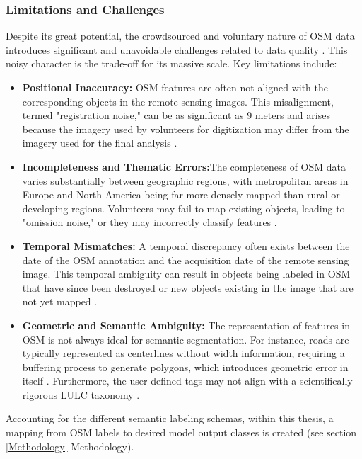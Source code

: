 \documentclass{report}
\begin{document}
\subsubsection{Limitations and Challenges}
\label{sec:osm_limitations_challenges}
Despite its great potential, the crowdsourced and voluntary nature of OSM data introduces significant and unavoidable challenges related to data quality \parencites[p.~3ff.]{UsmaniEtAlRemoteSensingDeepLearningUnderstandNoisyOpenStreetMap2023}. This noisy character is the trade-off for its massive scale. Key limitations include:
\begin{itemize}
\item \textbf{Positional Inaccuracy:} OSM features are often not aligned with the corresponding objects in the remote sensing images. This misalignment, termed "registration noise," can be as significant as 9 meters and arises because the imagery used by volunteers for digitization may differ from the imagery used for the final analysis \parencites[p.~2;]{UsmaniEtAlRemoteSensingDeepLearningUnderstandNoisyOpenStreetMap2023}[p.~1, 3]{KaiserEtAlLearningAerialImageSegmentationOnlineMaps2017}.


    \item \textbf{Incompleteness and Thematic Errors:}The completeness of OSM data varies substantially between geographic regions, with metropolitan areas in Europe and North America being far more densely mapped than rural or developing regions\parencites[p.~4]{DengNewsamQuantitativeComparisonOpenSourceDataFineGrainMappingLandUse2017}. Volunteers may fail to map existing objects, leading to "omission noise," or they may incorrectly classify features \parencites[p.~3]{UsmaniEtAlRemoteSensingDeepLearningUnderstandNoisyOpenStreetMap2023}.
    \item \textbf{Temporal Mismatches:} A temporal discrepancy often exists between the date of the OSM annotation and the acquisition date of the remote sensing image. This temporal ambiguity can result in objects being labeled in OSM that have since been destroyed or new objects existing in the image that are not yet mapped \parencites[p.~1;]{KaiserEtAlLearningAerialImageSegmentationOnlineMaps2017}[p.~3f.]{UsmaniEtAlRemoteSensingDeepLearningUnderstandNoisyOpenStreetMap2023}.
    \item \textbf{Geometric and Semantic Ambiguity:} The representation of features in OSM is not always ideal for semantic segmentation. For instance, roads are typically represented as centerlines without width information, requiring a buffering process to generate polygons, which introduces geometric error in itself \parencites[p.~3]{KaiserEtAlLearningAerialImageSegmentationOnlineMaps2017}. Furthermore, the user-defined tags may not align with a scientifically rigorous LULC taxonomy \parencites[p.~4]{DengNewsamQuantitativeComparisonOpenSourceDataFineGrainMappingLandUse2017}.

\end{itemize}
Accounting for the different semantic labeling schemas, within this thesis, a mapping from OSM labels to desired model output classes is created (see section \ref{Methodology} Methodology).
\end{document}
